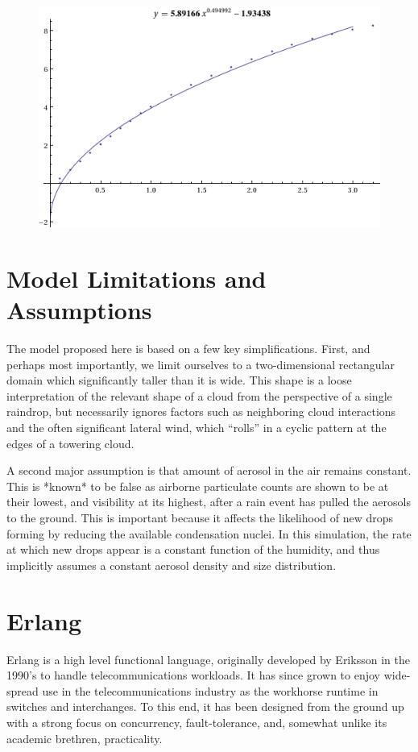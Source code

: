 \documentclass[twocolumn,a4paper,10pt]{article}
\begin{document}
\begin{figure}[t]
    \centering
    \includegraphics[width=0.75\linewidth]{terminal_velocity}
    \caption{}
    \label{fig:velocity}
\end{figure}





\section{Model Limitations and Assumptions}

The model proposed here is based on a few key simplifications. First, and
perhaps most importantly, we limit ourselves to a two-dimensional rectangular
domain which significantly taller than it is wide. This shape is a loose
interpretation of the relevant shape of a cloud from the perspective of a single
raindrop, but necessarily ignores factors such as neighboring cloud
interactions and the often significant lateral wind, which ``rolls'' in a cyclic
pattern at the edges of a towering cloud.

A second major assumption is that amount of aerosol in the air remains constant.
This is *known* to be false as airborne particulate counts are shown to be at
their lowest, and visibility at its highest, after a rain event has pulled the
aerosols to the ground. This is important because it affects the likelihood of
new drops forming by reducing the available condensation nuclei. In this
simulation, the rate at which new drops appear is a constant function of the
humidity, and thus implicitly assumes a constant aerosol density and size
distribution.

\section{Erlang}
Erlang is a high level functional language, originally developed by Eriksson in the 1990's to handle telecommunications workloads. It has since grown to enjoy wide-spread use in the telecommunications industry as the workhorse runtime in switches and interchanges. To this end, it has been designed from the ground up with a strong focus on concurrency, fault-tolerance, and, somewhat unlike its academic brethren, practicality.
\end{document}
